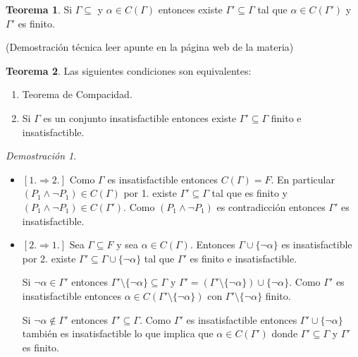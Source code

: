 \documentclass[a4paper,11pt]{article}
\theoremstyle{definition}
\newtheorem{teor}{Teorema}[section]
\theoremstyle{remark}
\newtheorem*{demo}{Demostración}
\begin{document}
\begin{teor}
	Si $\Gamma \subseteq$ y $\alpha \in C(\Gamma)$ entonces existe $\Gamma' \subseteq \Gamma$ tal que
	$\alpha \in C(\Gamma')$ y $\Gamma'$ es finito.
\end{teor}

(Demostración técnica leer apunte en la página web de la materia)

\begin{teor}
	Las siguientes condiciones son equivalentes:
	\begin{enumerate}
		\item Teorema de Compacidad.
		
		\item Si $\Gamma$ es un conjunto insatisfactible entonces existe $\Gamma' \subseteq \Gamma$ 
		finito e insatisfactible.
	\end{enumerate}
\end{teor}

\begin{demo}
	\begin{itemize}
		\item $[1. \Rightarrow 2.]$ Como $\Gamma$ es insatisfactible entonces $C(\Gamma) = F$.
		En particular $(P_1 \wedge \neg P_1) \in C(\Gamma)$ por 1. existe $\Gamma' \subseteq \Gamma$
		tal que es finito y $(P_1 \wedge \neg P_1) \in C(\Gamma')$.  Como $(P_1 \wedge \neg P_1)$
		es contradicción entonces $\Gamma'$ es insatisfactible.
		
		\item $[2. \Rightarrow 1.]$ Sea $\Gamma \subseteq F$ y sea $\alpha \in C(\Gamma)$.
		Entonces $\Gamma \cup \{\neg\alpha\}$ es insatisfactible por 2. existe 
		$\Gamma' \subseteq \Gamma \cup \{\neg\alpha\}$ tal que $\Gamma'$ es finito e
		insatisfactible.
		
		Si $\neg\alpha \in \Gamma'$ entonces $\Gamma' \setminus \{\neg\alpha\} 
		\subseteq \Gamma$ y $\Gamma' = (\Gamma' \setminus \{\neg\alpha\}) \cup \{\neg\alpha\}$.
		Como $\Gamma'$ es insatisfactible entonces $\alpha \in C(\Gamma' \setminus \{\neg\alpha\})$
		con $\Gamma' \setminus \{\neg\alpha\}$ finito.
		
		Si $\neg\alpha \not\in \Gamma'$ entonces $\Gamma' \subseteq \Gamma$. Como $\Gamma'$
		es insatisfactible entonces $\Gamma' \cup \{\neg\alpha\}$ también es insatisfactible
		lo que implica que $\alpha \in C(\Gamma')$ donde $\Gamma' \subseteq \Gamma$ y 
		$\Gamma'$ es finito.
	\end{itemize}
\end{demo}
\end{document}
